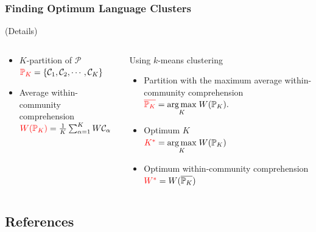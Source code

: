 \documentclass{beamer}
\newcommand{\hbDefined}[1]{\textcolor{red}{{#1}}}
\newcommand{\hbSet}[1]{\mathcal{#1}}
\newcommand{\argmax}[2]{\underset{#1}{\operatorname{arg \, max}}\;#2}
\theoremstyle{plain}
\theoremstyle{definition}
\theoremstyle{remark}
\begin{document}
\begin{frame}\frametitle{Finding Optimum Language Clusters}
	(Details)
	\begin{columns}[T]
	\begin{column}{.5\linewidth}
		\begin{itemize}
			\item
			$K$-partition of $\hbSet{P}$\\
			$
				\hbDefined{\mathbb{P}_K }
				=
					 \{ \hbSet{C}_{1}, \hbSet{C}_{2}, \cdots , \hbSet{C}_{K} \}
			$ 
			
			\item
			Average within-community comprehension\\
			$
				\hbDefined{W({\mathbb{P}_K})} 
				=
					\frac{1}{K}
					\sum_{\alpha = 1}^{K}
						W{\hbSet{C}_{\alpha}}
			$
			
		\end{itemize}
	\end{column}
	\begin{column}{.5\linewidth}
	    	Using $k$-means clustering
		\begin{itemize}
			
			\item
			Partition with the maximum 
			average within-community comprehension\\
			$
				\hbDefined{\overline{\mathbb{P}_{K}}}
				=
					\argmax
						{K}
						{W(\mathbb{P}_{K})}.
			$
			
			\item
			Optimum $K$\\
			$
				\hbDefined{K^{*}} 
				= 
					\argmax
						{K}
						{W(\mathbb{P}_{K})}
			$

			\item
			Optimum within-community comprehension\\
			$
				\hbDefined{W^{*}}
				=
					W(\overline{\mathbb{P}_{K}})
			$
			
		\end{itemize}
	\end{column}
	\end{columns}
\end{frame}




\subsection{References}
\end{document}
